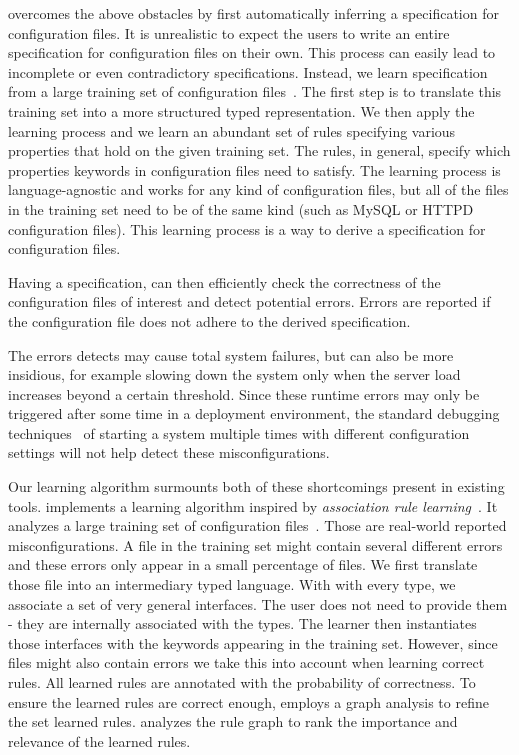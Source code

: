 \app overcomes the above obstacles by first automatically inferring a
specification for configuration files. It is unrealistic to expect the 
users to write an entire specification for configuration files on their own. 
This process can easily lead to incomplete or even contradictory 
specifications. Instead, we learn specification from 
a large training set of 
configuration files~\cite{configdataset}. The first step is to 
translate this training set into a more structured typed representation.
We then apply the learning process and we learn an abundant set of rules 
specifying various properties that hold on the given training set. The rules, in general, 
specify which properties keywords in configuration files need to satisfy.
The learning process is language-agnostic and works for any kind 
of configuration files,  but all of the files in the training set need to be of 
the same kind (such as MySQL or HTTPD configuration files).
This learning process is a way to derive a specification for configuration files. 

Having a specification, \app can then efficiently check 
the correctness of the configuration files of interest and detect 
potential errors. Errors are reported if the configuration file does not 
adhere to the derived specification.

The errors \app detects may cause total system failures, but can also be more insidious, for example slowing down the system only when the server load increases beyond a certain threshold.
Since these runtime errors may only be triggered after some time in a deployment environment, the standard debugging 
techniques~\cite{Zeller:2005:WPF:1077048} of starting a system multiple times with different configuration settings will not help detect these misconfigurations.

Our learning algorithm surmounts both of these shortcomings present in 
existing tools.  \app implements a learning
algorithm inspired by {\em association rule
learning}~\cite{agrawal1993mining}. It analyzes a large training set of configuration files~\cite{configdataset}. Those are real-world reported misconfigurations. A file in the training set might 
contain several different errors and these errors only appear 
in a small percentage of files. We first translate those file into an 
intermediary typed language. With with every type, we associate 
a set of very general interfaces. The user does not
need to provide them - they are internally associated with the types. The 
learner then instantiates those interfaces with the keywords appearing in 
the training set. However, since files might also contain errors we take 
this into account when learning correct rules. All learned rules are 
annotated with the probability of correctness.  
To ensure the learned rules are correct enough,
\app employs a graph analysis to refine the set learned rules.
\app analyzes the rule graph to rank the importance and relevance of the learned rules. 

